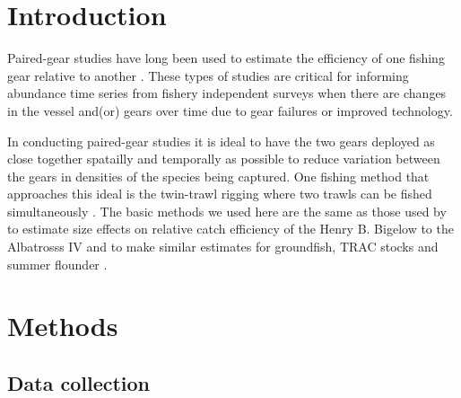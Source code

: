 \documentclass[12pt,letterpaper, leqno]{article}
\begin{document}
\pagebreak

\section*{Introduction}

Paired-gear studies have long been used to estimate the efficiency of one fishing gear relative to another \citep[e.g.,][]{gulland64,bourne65}.  These types of studies are critical for informing abundance time series from fishery independent surveys when there are changes in the vessel and(or) gears over time due to gear failures or improved technology. 

In conducting paired-gear studies it is ideal to have the two gears deployed as close together spatailly and temporally as possible to reduce variation between the gears in densities of the species being captured. One fishing method that approaches this ideal is the twin-trawl rigging where two trawls can be fished simultaneously \citep{ices96}. The basic methods we used here are the same as those used by \citet{miller13} to estimate size effects on relative catch efficiency of the Henry B. Bigelow to the Albatrosss IV and to make similar estimates for groundfish, TRAC stocks and summer flounder \citet{milleretal17a,milleretal17b}.   

\section*{Methods}

\subsection*{Data collection}
\end{document}
